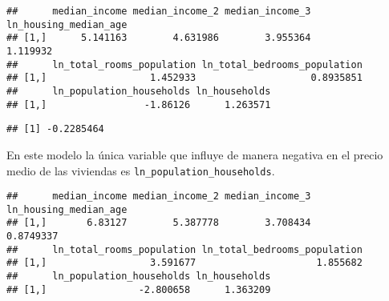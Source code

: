 \documentclass[
]{article}
\newenvironment{Shaded}{\begin{snugshade}}{\end{snugshade}}
\newcommand{\DecValTok}[1]{\textcolor[rgb]{0.00,0.00,0.81}{#1}}
\newcommand{\KeywordTok}[1]{\textcolor[rgb]{0.13,0.29,0.53}{\textbf{#1}}}
\newcommand{\NormalTok}[1]{#1}
\newcommand{\OperatorTok}[1]{\textcolor[rgb]{0.81,0.36,0.00}{\textbf{#1}}}
\newcommand{\StringTok}[1]{\textcolor[rgb]{0.31,0.60,0.02}{#1}}
\begin{document}
\begin{Shaded}
\end{Shaded}

\begin{verbatim}
##      median_income median_income_2 median_income_3 ln_housing_median_age
## [1,]      5.141163        4.631986        3.955364              1.119932
##      ln_total_rooms_population ln_total_bedrooms_population
## [1,]                  1.452933                    0.8935851
##      ln_population_households ln_households
## [1,]                 -1.86126      1.263571
\end{verbatim}

\begin{Shaded}
\end{Shaded}

\begin{verbatim}
## [1] -0.2285464
\end{verbatim}

En este modelo la única variable que influye de manera negativa en el
precio medio de las viviendas es \texttt{ln\_population\_households}.

\begin{Shaded}
\end{Shaded}

\begin{verbatim}
##      median_income median_income_2 median_income_3 ln_housing_median_age
## [1,]       6.83127        5.387778        3.708434             0.8749337
##      ln_total_rooms_population ln_total_bedrooms_population
## [1,]                  3.591677                     1.855682
##      ln_population_households ln_households
## [1,]                -2.800658      1.363209
\end{verbatim}
\end{document}
